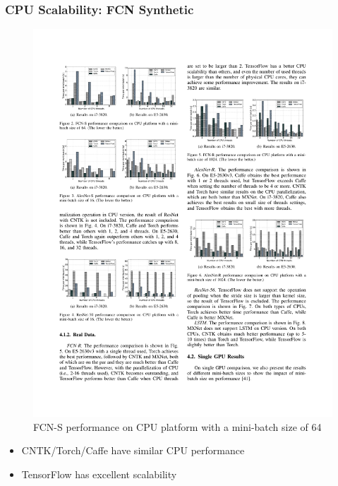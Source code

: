 \begin{frame}
	\MyLogo
	\frametitle{CPU Scalability: FCN Synthetic}  

\begin{figure}[htbp] 
	\includegraphics[width=\linewidth]{figures/FCN-S1.pdf} 
	\caption{FCN-S performance on CPU platform with a mini-batch size of 64}
\end{figure}
	
\vskip -10pt
\begin{mdframed}[style=mystyle1]
\begin{itemize}
\item CNTK/Torch/Caffe have similar CPU performance
\item TensorFlow has excellent scalability
\end{itemize}
\end{mdframed}

\end{frame}



